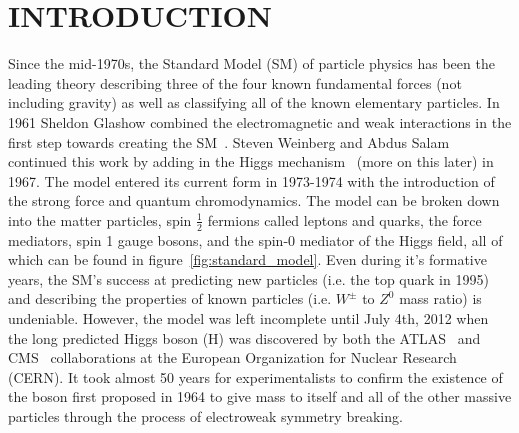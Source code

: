 %
%
%



\pagestyle{plain} %
\setcounter{page}{1}


\chapter{\uppercase {Introduction}}

Since the mid-1970s, the Standard Model (SM) of particle physics has been the leading theory describing three of the four known fundamental forces (not including gravity) as well as classifying all of the known elementary particles.
In 1961 Sheldon Glashow combined the electromagnetic and weak interactions in the first step towards creating the SM~\cite{GLASHOW1961579}.
Steven Weinberg and Abdus Salam~\cite{PhysRevLett.19.1264,salam} continued this work by adding in the Higgs mechanism~\cite{PhysRevLett.13.321,PhysRevLett.13.508,PhysRevLett.13.585} (more on this later) in 1967.
The model entered its current form in 1973-1974 with the introduction of the strong force and quantum chromodynamics.
The model can be broken down into the matter particles, spin $\frac{1}{2}$ fermions called leptons and quarks, the force mediators, spin 1 gauge bosons, and the spin-0 mediator of the Higgs field, all of which can be found in figure~\ref{fig:standard_model}.
Even during it's formative years, the SM's success at predicting new particles (i.e. the top quark in 1995) and describing the properties of known particles (i.e. $W^{\pm}$ to $Z^{0}$ mass ratio) is undeniable.
However, the model was left incomplete until July 4th, 2012 when the long predicted Higgs boson (H) was discovered by both the ATLAS~\cite{20121} and CMS~\cite{201230} collaborations at the European Organization for Nuclear Research (CERN).
It took almost 50 years for experimentalists to confirm the existence of the boson first proposed in 1964 to give mass to itself and all of the other massive particles through the process of electroweak symmetry breaking.

